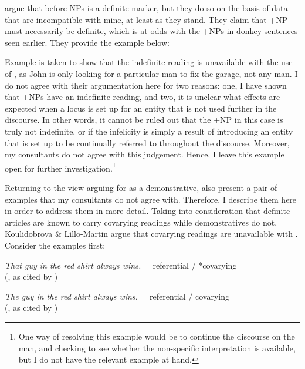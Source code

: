 \documentclass[output=paper,
modfonts
]{langscibook}
\begin{document}
\citet{Bahanetal1995} argue that  before NPs is a definite marker, but they do so on the basis of data that are incompatible with mine, at least as they stand. They claim that +NP must necessarily be definite, which is at odds with the +NPs in donkey sentences seen earlier. They provide the example below: 

\begin{exe}
\end{exe}

Example  is taken to show that the indefinite reading is unavailable with the use of , as John is only looking for a particular man to fix the garage, not any man. I do not agree with their argumentation here for two reasons: one, I have shown that +NPs have an indefinite reading, and two, it is unclear what effects are expected when a locus is set up for an entity that is not used further in the discourse. In other words, it cannot be ruled out that the +NP  in this case is truly not indefinite, or if the infelicity is simply a result of introducing an entity that is set up to be continually referred to throughout the discourse. Moreover, my consultants do not agree with this judgement. Hence, I leave this example open for further investigation.\footnote{One way of resolving this example would be to continue the discourse on the man, and checking to see whether the non-specific interpretation is available, but I do not have the relevant example at hand.} 


Returning to the view arguing for  as a demonstrative, \citet{KoulidobrovaLilloMartin2016} also present a pair of examples that my consultants do not agree with. Therefore, I describe them here in order to address them in more detail. Taking into consideration that definite articles are known to carry covarying readings while demonstratives do not, Koulidobrova \& Lillo-Martin argue that covarying readings are unavailable with . Consider the  examples first:

\begin{exe}
	\ex \label{ex:irani:84} \textit{That guy in the red shirt always wins.} = referential / *covarying \\ (\citealt{Nowak2013}, as cited by \citealt[229]{KoulidobrovaLilloMartin2016}) 
	
	\ex \label{ex:irani:85} \textit{The guy in the red shirt always wins.} = referential / covarying \\ (\citealt{Nowak2013}, as cited by \citealt[229]{KoulidobrovaLilloMartin2016}) 
\end{exe}
\end{document}
